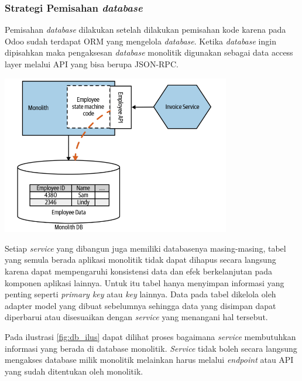\subsubsection{Strategi Pemisahan \textit{database}}
Pemisahan \textit{database} dilakukan setelah dilakukan pemisahan kode karena pada Odoo sudah terdapat ORM yang mengelola \textit{database}. Ketika \textit{database} ingin dipisahkan maka pengaksesan \textit{database} monolitik  digunakan sebagai data access layer melalui API yang bisa berupa JSON-RPC.

\begin{center}
	\includegraphics[width=10cm]{img/bab_3/expose_api_db.png}
	\label{fig:db_ilus}
\end{center}

Setiap \textit{service} yang dibangun juga memiliki databasenya masing-masing, tabel yang semula berada aplikasi monolitik tidak dapat dihapus secara langsung karena dapat mempengaruhi konsistensi data dan efek berkelanjutan pada komponen aplikasi lainnya. Untuk itu tabel hanya menyimpan informasi yang penting seperti \textit{primary key} atau \textit{key} lainnya. Data pada tabel dikelola oleh adapter model yang dibuat sebelumnya sehingga data yang disimpan dapat diperbarui atau disesuaikan dengan \textit{service} yang menangani hal tersebut. 

Pada ilustrasi \ref{fig:db_ilus} dapat dilihat proses bagaimana \textit{service} membutuhkan informasi yang berada di database monolitik. \textit{Service} tidak boleh secara langsung mengakses database milik monolitik melainkan harus melalui \textit{endpoint} atau API yang sudah ditentukan oleh monolitik.
\\ 

